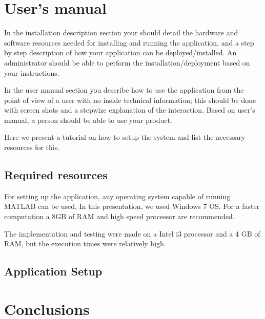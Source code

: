 \documentclass[12pt,a4paper,twoside]{report}
\begin{document}
{\chapter{User's manual}
In the installation description section your should detail the hardware and software resources needed for installing and running the application, and a step by step description of how your application can be deployed/installed. An administrator should be able to perform the installation/deployment based on your instructions.

In the user manual section you describe how to use the application from the point of view of a user with no inside technical information; this should be done with screen shots and a stepwize explanation of the interaction. Based on user's manual, a person should be able to use your product.

Here we present a tutorial on how to setup the system and list the necessary resources for this.

\section{Required resources}
For setting up the application, any operating system capable of running MATLAB can be used. In this presentation, we used Windows 7 OS. For a faster computation a 8GB of RAM and high speed processor are recommended. 

The implementation and testing were made on a Intel i3 processor and a 4 GB of RAM, but the execution times were relatively high.



\section{Application Setup}
\begin{enumerate}
	\item Copy the contents of the CD to  and extract the archive.
	\item Start MATLAB.
	\item Set MATLAB working directory to 
\end{document}
